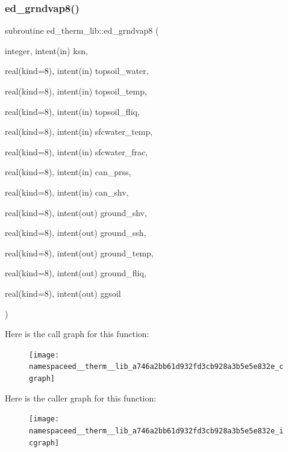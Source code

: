 \subsubsection{\texorpdfstring{ed\+\_\+grndvap8()}{ed\_grndvap8()}}
{\footnotesize\ttfamily subroutine ed\+\_\+therm\+\_\+lib\+::ed\+\_\+grndvap8 (\begin{DoxyParamCaption}\item[{integer, intent(in)}]{ksn,  }\item[{real(kind=8), intent(in)}]{topsoil\+\_\+water,  }\item[{real(kind=8), intent(in)}]{topsoil\+\_\+temp,  }\item[{real(kind=8), intent(in)}]{topsoil\+\_\+fliq,  }\item[{real(kind=8), intent(in)}]{sfcwater\+\_\+temp,  }\item[{real(kind=8), intent(in)}]{sfcwater\+\_\+frac,  }\item[{real(kind=8), intent(in)}]{can\+\_\+prss,  }\item[{real(kind=8), intent(in)}]{can\+\_\+shv,  }\item[{real(kind=8), intent(out)}]{ground\+\_\+shv,  }\item[{real(kind=8), intent(out)}]{ground\+\_\+ssh,  }\item[{real(kind=8), intent(out)}]{ground\+\_\+temp,  }\item[{real(kind=8), intent(out)}]{ground\+\_\+fliq,  }\item[{real(kind=8), intent(out)}]{ggsoil }\end{DoxyParamCaption})}

Here is the call graph for this function\+:
\nopagebreak
\begin{figure}[H]
\begin{center}
\leavevmode
\texttt{[image: namespaceed\_\_therm\_\_lib\_a746a2bb61d932fd3cb928a3b5e5e832e\_cgraph]}
\end{center}
\end{figure}
Here is the caller graph for this function\+:
\nopagebreak
\begin{figure}[H]
\begin{center}
\leavevmode
\texttt{[image: namespaceed\_\_therm\_\_lib\_a746a2bb61d932fd3cb928a3b5e5e832e\_icgraph]}
\end{center}
\end{figure}
\mbox{\label{namespaceed__therm__lib_ae2a805729a52bf5814d2c3a0d84f6fe8}} 
